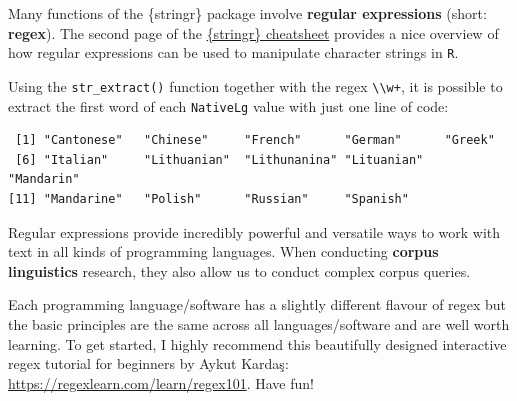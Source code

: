 \documentclass[
  letterpaper,
  DIV=11,
  numbers=noendperiod]{scrreprt}
\newenvironment{Shaded}{\begin{snugshade}}{\end{snugshade}}
\newcommand{\FunctionTok}[1]{\textcolor[rgb]{0.28,0.35,0.67}{#1}}
\newcommand{\NormalTok}[1]{\textcolor[rgb]{0.00,0.23,0.31}{#1}}
\newcommand{\SpecialCharTok}[1]{\textcolor[rgb]{0.37,0.37,0.37}{#1}}
\newcommand{\StringTok}[1]{\textcolor[rgb]{0.13,0.47,0.30}{#1}}
\begin{document}
\begin{tcolorbox}[enhanced jigsaw, arc=.35mm, bottomrule=.15mm, bottomtitle=1mm, breakable, colback=white, colbacktitle=quarto-callout-note-color!10!white, colframe=quarto-callout-note-color-frame, coltitle=black, left=2mm, leftrule=.75mm, opacityback=0, opacitybacktitle=0.6, rightrule=.15mm, title=\textcolor{quarto-callout-note-color}{\faInfo}\hspace{0.5em}{Using regular expressions (regex)}, titlerule=0mm, toprule=.15mm, toptitle=1mm]

Many functions of the \{stringr\} package involve \textbf{regular
expressions} (short: \textbf{regex}). The second page of the
\href{https://github.com/rstudio/cheatsheets/blob/main/strings.pdf}{\{stringr\}
cheatsheet} provides a nice overview of how regular expressions can be
used to manipulate character strings in \texttt{R}.

Using the \texttt{str\_extract()} function together with the regex
\texttt{\textbackslash{}\textbackslash{}w+}, it is possible to extract
the first word of each \texttt{NativeLg} value with just one line of
code:

\begin{Shaded}
\end{Shaded}

\begin{verbatim}
 [1] "Cantonese"   "Chinese"     "French"      "German"      "Greek"      
 [6] "Italian"     "Lithuanian"  "Lithunanina" "Lituanian"   "Mandarin"   
[11] "Mandarine"   "Polish"      "Russian"     "Spanish"    
\end{verbatim}

Regular expressions provide incredibly powerful and versatile ways to
work with text in all kinds of programming languages. When conducting
\textbf{corpus linguistics} research, they also allow us to conduct
complex corpus queries.

Each programming language/software has a slightly different flavour of
regex but the basic principles are the same across all
languages/software and are well worth learning. To get started, I highly
recommend this beautifully designed interactive regex tutorial for
beginners by Aykut Kardaş: \url{https://regexlearn.com/learn/regex101}.
Have fun! 

\end{tcolorbox}
\end{document}
